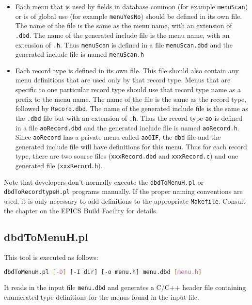 \begin{itemize}
\item Each menu that is used by fields in database common (for example \verb|menuScan|) or is of global use (for example \verb|menuYesNo|) should be defined in its own file.
The name of the file is the same as the menu name, with an extension of \verb|.dbd|.
The name of the generated include file is the menu name, with an extension of \verb|.h|.
Thus \verb|menuScan| is defined in a file \verb|menuScan.dbd| and the generated include file is named \verb|menuScan.h|

\item Each record type is defined in its own file.
This file should also contain any menu definitions that are used only by that record type.
Menus that are specific to one particular record type should use that record type name as a prefix to the menu name.
The name of the file is the same as the record type, followed by \verb|Record.dbd|.
The name of the generated include file is the same as the \verb|.dbd| file but with an extension of \verb|.h|.
Thus the record type \verb|ao| is defined in a file \verb|aoRecord.dbd| and the generated include file is named \verb|aoRecord.h|.
Since \verb|aoRecord| has a private menu called \verb|aoOIF|, the \verb|dbd| file and the generated include file will have definitions for this menu.
Thus for each record type, there are two source files (\verb|xxxRecord.dbd| and \verb|xxxRecord.c|) and one generated file (\verb|xxxRecord.h|).
\end{itemize}

Note that developers don't normally execute the \verb|dbdToMenuH.pl| or \verb|dbdToRecordtypeH.pl| programs manually.
If the proper naming conventions are used, it is only necessary to add definitions to the appropriate \verb|Makefile|.
Consult the chapter on the EPICS Build Facility for details.

\subsection{dbdToMenuH.pl}

This tool is executed as follows:

\begin{lstlisting}[language=sh]
dbdToMenuH.pl [-D] [-I dir] [-o menu.h] menu.dbd [menu.h]
\end{lstlisting}

It reads in the input file \verb|menu.dbd| and generates a C/C++ header file containing enumerated type definitions for the menus found in the input file.

